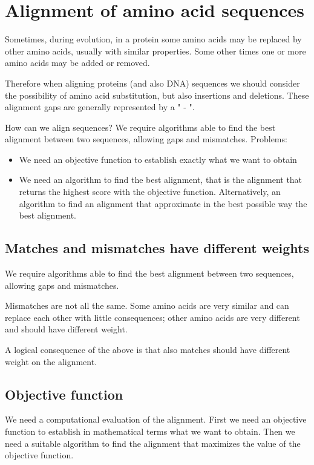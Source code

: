 \section{Alignment of amino acid sequences}

Sometimes, during evolution, in a protein some amino acids may be replaced
by other amino acids, usually with similar properties. Some other times one or
more amino acids may be added or removed.

Therefore when aligning proteins (and also DNA) sequences we should consider
the possibility of amino acid substitution, but also insertions and deletions.
These alignment gaps are generally represented by a " - ".

How can we align sequences?
We require algorithms able to find the best alignment between two sequences,
allowing gaps and mismatches.
Problems:
\begin{itemize}
  \item We need an objective function to establish exactly what we want to
obtain
  \item We need an algorithm to find the best alignment, that is the alignment
that returns the highest score with the objective function. Alternatively, an
algorithm to find an alignment that approximate in the best possible way the
best alignment.
\end{itemize}

\subsection{Matches and mismatches have different weights}

We require algorithms able to find the best alignment between two sequences,
allowing gaps and mismatches.

Mismatches are not all the same. Some amino acids are very similar and can
replace each other with little consequences; other amino acids are very
different and should have different weight.

A logical consequence of the above is that also matches should have different
weight on the alignment.

\subsection{Objective function}

We need a computational evaluation of the alignment. First we need an objective
function to establish in mathematical terms what we want to obtain.
Then we need a suitable algorithm to find the alignment that maximizes the
value of the objective function.

